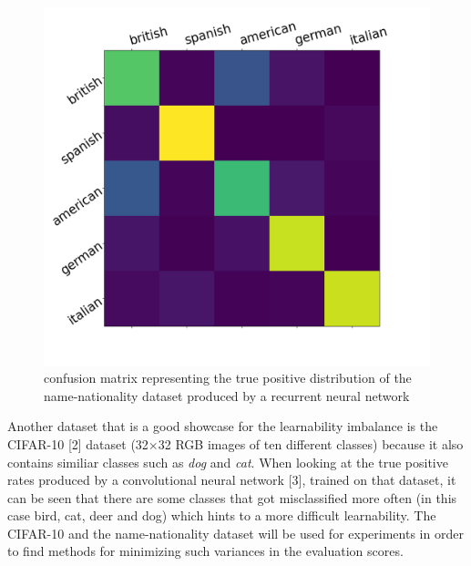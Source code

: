 \documentclass[journal]{IEEEtran}
\begin{document}
\begin{figure}[h!]
        \includegraphics[width=\linewidth]{images/nec_confusion_matrix.png}
        \caption{confusion matrix representing the true positive distribution of the name-nationality dataset produced by a recurrent neural network}
        \label{fig:tp_scores}
\end{figure}

Another dataset that is a good showcase for the learnability imbalance is the CIFAR-10 [2] dataset (32$\times$32 RGB images of ten different classes) because it also contains similiar classes such as \emph{dog} and \emph{cat}.
When looking at the true positive rates produced by a convolutional neural network [3], trained on that dataset, it can be seen that there are some classes that got misclassified more often (in this case bird, cat, deer and dog) which hints to a more difficult learnability. 
The CIFAR-10 and the name-nationality dataset will be used for experiments in order to find methods for minimizing such variances in the evaluation scores.
\end{document}
